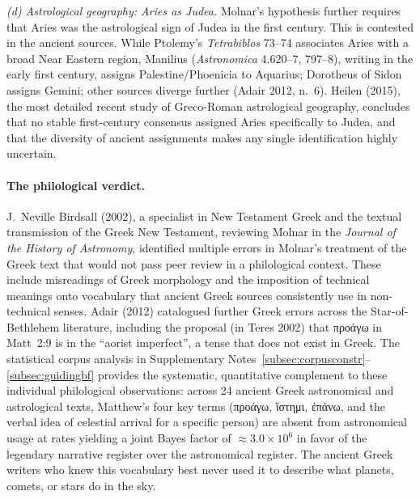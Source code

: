 \documentclass[11pt,a4paper]{article}
\newcommand{\grk}[1]{{\fontencoding{LGR}\selectfont #1}}
\newcommand{\grk}[1]{{\greekfont #1}}
\begin{document}
\textit{(d) Astrological geography: Aries as Judea.}  Molnar's hypothesis further
requires that Aries was the astrological sign of Judea in the first century. This is
contested in the ancient sources. While Ptolemy's \textit{Tetrabiblos} 73--74 associates
Aries with a broad Near Eastern region, Manilius (\textit{Astronomica} 4.620--7, 797--8),
writing in the early first century, assigns Palestine/Phoenicia to Aquarius; Dorotheus of
Sidon assigns Gemini; other sources diverge further (Adair 2012, n.~6)\cite{adair2012}.
Heilen (2015)\cite{heilen2015}, the most detailed recent study of Greco-Roman astrological
geography, concludes that no stable first-century consensus assigned Aries specifically
to Judea, and that the diversity of ancient assignments makes any single identification
highly uncertain.

\paragraph{The philological verdict.}
J.~Neville Birdsall (2002)\cite{birdsall2002}, a specialist in New Testament Greek and
the textual transmission of the Greek New Testament, reviewing Molnar in the
\textit{Journal of the History of Astronomy}, identified multiple errors in Molnar's
treatment of the Greek text that would not pass peer review in a philological context.
These include misreadings of Greek morphology and the imposition of technical meanings
onto vocabulary that ancient Greek sources consistently use in non-technical senses.
Adair (2012)\cite{adair2012} catalogued further Greek errors across the Star-of-Bethlehem
literature, including the proposal (in Teres 2002) that \grk{προάγω} in Matt~2:9 is in
the ``aorist imperfect'', a tense that does not exist in Greek. The statistical corpus
analysis in Supplementary Notes~\ref{subsec:corpusconstr}--\ref{subsec:guidingbf} provides the systematic, quantitative complement to these
individual philological observations: across 24 ancient Greek astronomical and astrological
texts, Matthew's four key terms (\grk{προάγω}, \grk{ἵστημι}, \grk{ἐπάνω}, and the verbal
idea of celestial arrival for a specific person) are absent from astronomical usage at
rates yielding a joint Bayes factor of ${\approx}3.0\times10^{6}$ in favor of the legendary
narrative register over the astronomical register. The ancient Greek writers who knew
this vocabulary best never used it to describe what planets, comets, or stars do in the
sky.


\end{document}
